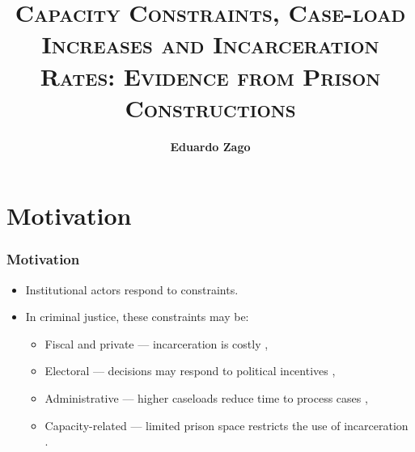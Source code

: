 \documentclass[10pt,aspectratio=169]{beamer}
\title{\Large\textsc{Capacity Constraints,
Case-load Increases and
Incarceration Rates: Evidence
from Prison Constructions}}
\author[Zago] %
{\textbf{Eduardo Zago}\inst{1}  \vspace{10pt}}
\institute []%
{  \inst{1}   PhD Student NYU Politics}
\date{\textsc{}}
\begin{document}
\maketitle

\section{Motivation}

\begin{frame}
\frametitle{Motivation}

\small

\begin{itemize}\setlength\itemsep{0.65em}
    \item Institutional actors respond to constraints.
    \pause
    \item In criminal justice, these constraints may be:
    \begin{itemize}\setlength\itemsep{0.65em}
        \item \alert{Fiscal and private} — incarceration is costly {\footnotesize\color{gray}\citep{Ouss-Incentives, Galinato-2020, Mukherjee-Private}}, 
        \item \alert{Electoral} — decisions may respond to political incentives {\footnotesize\color{gray}\citep{Gordon-Judges-Election, Berdejo-PoliticalCycles}}, 
        \item \alert{Administrative} — higher caseloads reduce time to process cases {\footnotesize\color{gray}\citep{Yang-Resource-AEJ, JudgeCaseloads-JPE-Shumway}}, %
        \item \alert{Capacity-related} — limited prison space restricts the use of incarceration {\footnotesize\color{gray}\citep{Schnepel}}. 
    \end{itemize}
\end{itemize}

\end{frame}
\end{document}
